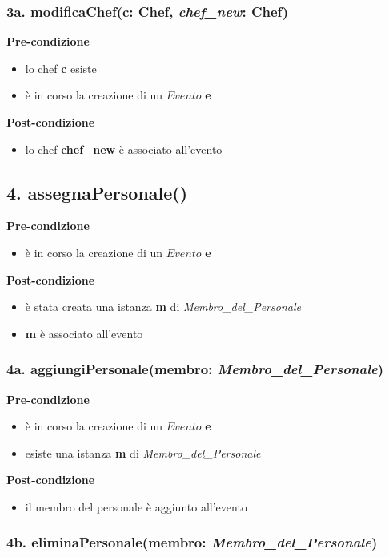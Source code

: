 \documentclass[14pt]{extarticle}
\begin{document}
\subsubsection*{3a. modificaChef(c: Chef, \textit{chef\_new}: Chef)}

\textbf{Pre-condizione}
\begin{itemize}
  \item lo chef \textbf{c} esiste
  \item è in corso la creazione di un $Evento$ \textbf{e}
\end{itemize}
\textbf{Post-condizione}
\begin{itemize}
  \item lo chef \textbf{chef\_new} è associato all'evento
\end{itemize}


\subsection*{4. assegnaPersonale()}

\textbf{Pre-condizione}
\begin{itemize}
  \item è in corso la creazione di un $Evento$ \textbf{e}
\end{itemize}
\textbf{Post-condizione}
\begin{itemize}
  \item è stata creata una istanza \textbf{m} di \textit{Membro\_del\_Personale}
  \item \textbf{m} è associato all'evento
\end{itemize}


\subsubsection*{4a. aggiungiPersonale(membro: \textit{Membro\_del\_Personale})}

\textbf{Pre-condizione}
\begin{itemize}
  \item è in corso la creazione di un $Evento$ \textbf{e}
  \item esiste una istanza \textbf{m} di \textit{Membro\_del\_Personale}
\end{itemize}
\textbf{Post-condizione}
\begin{itemize}
  \item il membro del personale è aggiunto all'evento
\end{itemize}


\subsubsection*{4b. eliminaPersonale(membro: \textit{Membro\_del\_Personale})}
\end{document}
